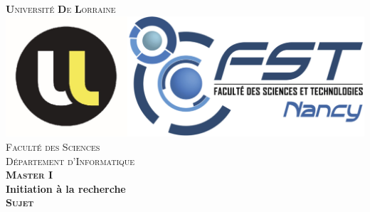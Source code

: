 \begin{titlepage}
\newcommand{\HRule}{\rule{\linewidth}{0.5mm}} %

\center %
 
\textsc{\Large \textbf{U}niversité \textbf{D}e \textbf{L}orraine}\\[0.5cm] %


\includegraphics[scale=0.2]{IMG/logo.eps}\\[0.5cm]

\textsc{\small Faculté des Sciences}\\
\textsc{\small Département d'Informatique}\\[2cm]
\textsc{\normalsize \textbf{Master I}}\\
\normalsize \textbf{Initiation à la recherche}\\[0.5cm]
\textsc{\normalsize \textbf{Sujet}}\\



\end{titlepage}
